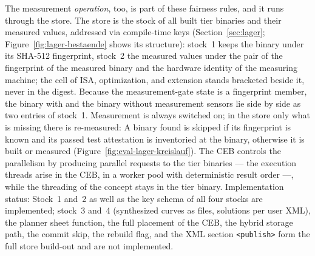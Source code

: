 \begin{nurlang}
The measurement \emph{operation}, too, is part of these fairness rules, and it runs through the
store. The store is the stock of all built tier binaries and their measured values, addressed via
compile-time keys (Section~\ref{sec:lager}; Figure~\ref{fig:lager-bestaende} shows its structure):
stock~1 keeps the binary under its SHA-512 fingerprint, stock~2 the measured values under the pair of
the fingerprint of the measured binary and the hardware identity of the measuring machine; the cell
of ISA, optimization, and extension stands bracketed beside it, never in the digest. Because the
measurement-gate state is a fingerprint member, the binary with and the binary without measurement
sensors lie side by side as two entries of stock~1. Measurement is always switched on; in the store
only what is missing there is re-measured: A binary found is skipped if its fingerprint is known and
its passed test attestation is inventoried at the binary, otherwise it is built or measured
(Figure~\ref{fig:eval-lager-kreislauf}). The CEB controls the parallelism by producing parallel
requests to the tier binaries --- the execution threads arise in the CEB, in a worker pool with
deterministic result order ---, while the threading of the concept stays in the tier binary.
Implementation status: Stock~1 and~2 as well as the key schema of all four stocks are implemented;
stock~3 and~4 (synthesized curves as files, solutions per user XML), the planner sheet function, the
full placement of the CEB, the hybrid storage path, the commit skip, the rebuild flag, and the XML
section \texttt{<publish>} form the full store build-out and are not implemented.
\begin{figure}[htbp]\centering
{}
\end{figure}
\end{nurlang}
